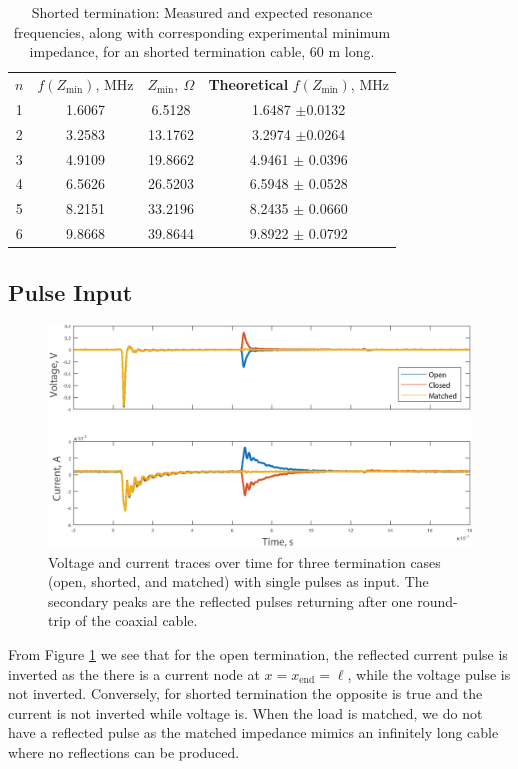\begin{table}[H]
    \centering
    \begin{tabular}{c|c|c|c}
          $n$ & $f(Z_\text{min})$, MHz &  $Z_\text{min}, \ \Omega$ & \textbf{Theoretical} $f(Z_\text{min})$, MHz \\
        1 & 1.6067 & 6.5128 & 1.6487 $\pm$0.0132  \\
        2 & 3.2583 & 13.1762 & 3.2974 $\pm$0.0264  \\
        3 & 4.9109 & 19.8662 & 4.9461 $\pm$ 0.0396 \\
        4 & 6.5626 & 26.5203 & 6.5948 $\pm$ 0.0528 \\
        5 & 8.2151 & 33.2196 & 8.2435 $\pm$ 0.0660 \\
        6 & 9.8668 & 39.8644 & 9.8922 $\pm$ 0.0792 \\
    \end{tabular}
    \caption{Shorted termination: Measured and expected resonance frequencies, along with corresponding experimental minimum impedance, for an shorted termination cable, 60 m long.}
    \label{tab:closed_resonance_freqs}
\end{table}


\subsection{Pulse Input}

\begin{figure}[H]
    \centering
    \includegraphics[width=\textwidth]{figures/TimePlot_V1.eps}
    \caption{Voltage and current traces over time for three termination cases (open, shorted, and matched) with single pulses as input. The secondary peaks are the reflected pulses returning after one round-trip of the coaxial cable.}
    \label{fig:time_plot}
\end{figure}
From Figure \ref{fig:time_plot} we see that for the open termination, the reflected current pulse is inverted as the there is a current node at $x=x_\text{end} = \ell$, while the voltage pulse is not inverted. Conversely, for shorted termination the opposite is true and the current is not inverted while voltage is. When the load is matched, we do not have a reflected pulse as the matched impedance mimics an infinitely long cable where no reflections can be produced.\\

